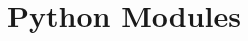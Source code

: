 \documentclass{xourse}
\title{Python Modules}
\begin{document}
  
\begin{abstract} %
\end{abstract}  
\maketitle  
 
\end{document}

